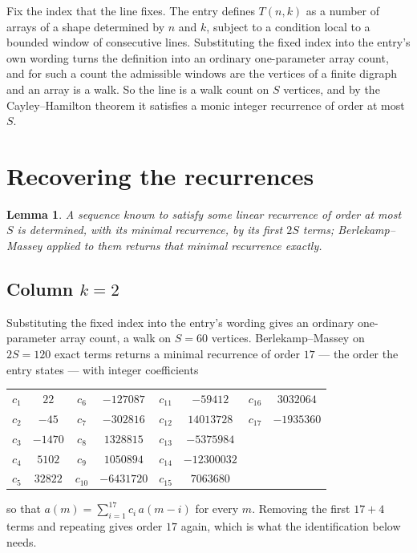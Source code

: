 \documentclass[11pt,a4paper]{article}
\theoremstyle{plain}
\newtheorem{lemma}[theorem]{Lemma}
\theoremstyle{definition}
\begin{document}
Fix the index that the line fixes. The entry defines $T(n,k)$ as a number of arrays of a shape
determined by $n$ and $k$, subject to a condition local to a bounded window of consecutive
lines. Substituting the fixed index into the entry's own wording turns the definition into an
ordinary one-parameter array count, and for such a count the admissible windows are the
vertices of a finite digraph and an array is a walk. So the line is a walk count on $S$
vertices, and by the Cayley--Hamilton theorem it satisfies a monic integer recurrence of order
at most $S$.

\section{Recovering the recurrences}

\begin{lemma}\label{lem:bm}
A sequence known to satisfy some linear recurrence of order at most $S$ is determined, with its
minimal recurrence, by its first $2S$ terms; Berlekamp--Massey applied to them returns that
minimal recurrence exactly.
\end{lemma}

\subsection*{Column $k=2$}
Substituting the fixed index into the entry's wording gives an ordinary one-parameter array
count, a walk on $S=60$ vertices. Berlekamp--Massey on $2S=120$ exact terms
returns a minimal recurrence of order $17$ --- the order the entry states --- with
integer coefficients
\begin{center}\small\begin{tabular}{cccccccc}
$c_{1}$ & $22$ & $c_{6}$ & $-127087$ & $c_{11}$ & $-59412$ & $c_{16}$ & $3032064$ \\
$c_{2}$ & $-45$ & $c_{7}$ & $-302816$ & $c_{12}$ & $14013728$ & $c_{17}$ & $-1935360$ \\
$c_{3}$ & $-1470$ & $c_{8}$ & $1328815$ & $c_{13}$ & $-5375984$ &  &  \\
$c_{4}$ & $5102$ & $c_{9}$ & $1050894$ & $c_{14}$ & $-12300032$ &  &  \\
$c_{5}$ & $32822$ & $c_{10}$ & $-6431720$ & $c_{15}$ & $7063680$ &  &  \\
\end{tabular}\end{center}
so that $a(m)=\sum_{i=1}^{17}c_i\,a(m-i)$ for every $m$. Removing the first
$17+4$ terms and repeating gives order $17$ again, which is what the
identification below needs.
\end{document}
